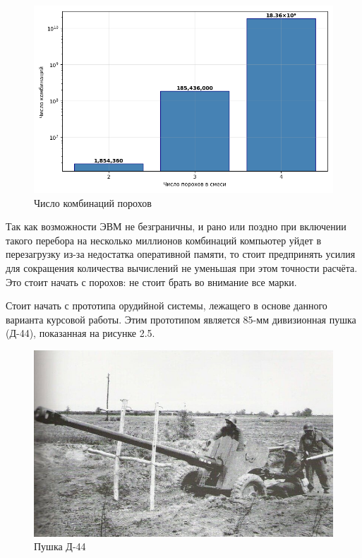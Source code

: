 \documentclass[14pt, a4paper]{extreport} %
\begin{document}
\begin{figure}[H]
\centering
\includegraphics[width=0.5\textheight]{imgs/GISTO.png}
\caption{Число комбинаций порохов}
\end{figure}

Так как возможности ЭВМ не безграничны, и рано или поздно при включении такого перебора на несколько миллионов комбинаций компьютер уйдет в перезагрузку из-за недостатка оперативной памяти, то стоит предпринять усилия
для сокращения количества вычислений не уменьшая при этом точности расчёта. Это стоит начать с порохов: не стоит брать во внимание все марки.

Стоит начать с прототипа орудийной системы, лежащего в основе данного варианта курсовой работы. Этим прототипом является 85-мм дивизионная пушка (Д-44), показанная на рисунке 2.5.

\begin{figure}[H]
\centering
\includegraphics[width=0.35\textheight]{imgs/D44.jpg}
\caption{Пушка Д-44}
\end{figure}
\end{document}

